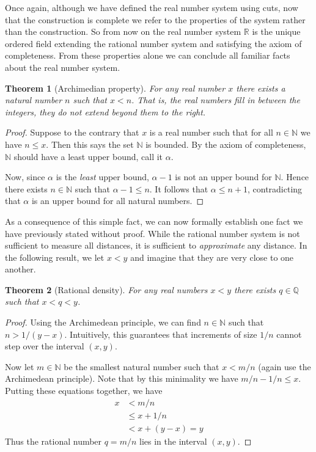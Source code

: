 \documentclass[11pt,oneside]{amsbook}
\newcommand{\NN}{\mathbb N}
\newcommand{\QQ}{\mathbb Q}
\newcommand{\RR}{\mathbb R}
\theoremstyle{definition}
\theoremstyle{plain}
\newtheorem{thm}{Theorem}[section]
\theoremstyle{definition}
\theoremstyle{remark}
\numberwithin{equation}{section}
\numberwithin{figure}{section}
\begin{document}
Once again, although we have defined the real number system using cuts, now that the construction is complete we refer to the properties of the system rather than the construction. So from now on the real number system $\RR$ is the unique ordered field extending the rational number system and satisfying the axiom of completeness. From these properties alone we can conclude all familiar facts about the real number system.

\begin{thm}[Archimedian property]
  For any real number $x$ there exists a natural number $n$ such that $x<n$. That is, the real numbers fill in between the integers, they do not extend beyond them to the right.
\end{thm}

\begin{proof}
  Suppose to the contrary that $x$ is a real number such that for all $n\in\NN$ we have $n\leq x$. Then this says the set $\NN$ is bounded. By the axiom of completeness, $\NN$ should have a least upper bound, call it $\alpha$.

  Now, since $\alpha$ is the \emph{least} upper bound, $\alpha-1$ is not an upper bound for $\NN$. Hence there exists $n\in\NN$ such that $\alpha-1\leq n$. It follows that $\alpha\leq n+1$, contradicting that $\alpha$ is an upper bound for all natural numbers.
\end{proof}

As a consequence of this simple fact, we can now formally establish one fact we have previously stated without proof. While the rational number system is not sufficient to measure all distances, it is sufficient to \emph{approximate} any distance. In the following result, we let $x<y$ and imagine that they are very close to one another.

\begin{thm}[Rational density]
  For any real numbers $x<y$ there exists $q\in\QQ$ such that $x<q<y$.
\end{thm}

\begin{proof}
  Using the Archimedean principle, we can find $n\in\NN$ such that $n>1/(y-x)$. Intuitively, this guarantees that increments of size $1/n$ cannot step over the interval $(x,y)$.

  Now let $m\in\NN$ be the smallest natural number such that $x<m/n$ (again use the Archimedean principle). Note that by this minimality we have $m/n-1/n\leq x$. Putting these equations together, we have
\begin{align*}
  x&<m/n\\
   &\leq x+1/n\\
   &<x+(y-x)=y
\end{align*}
Thus the rational number $q=m/n$ lies in the interval $(x,y)$.
\end{proof}
\end{document}
